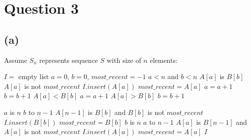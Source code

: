 
\section{Question 3}
    \subsection{(a)} 
    Assume $S_n$ represents sequence $S$ with size of $n$ elements:
    \begin{codebox}
        \li $I =$ empty list
        \li $a = 0$, $b = 0$, $most\_recent = -1$
        \li \While $a < n$ and $b<n$
            \Do
                \li \If $A[a]$ is $B[b]$
                \Then
                    \li \If $A[a]$ is not $most\_recent$
                    \Then
                        \li $I.insert(A[a])$
                        \li $most\_recent = A[a]$
                    \End
                    \li $a = a + 1$
                    \li $b = b + 1$
                \li \ElseIf $A[a] < B[b]$
                \Then
                    \li $a = a + 1$
                \li \ElseIf $A[a] > B[b]$
                \Then
                    \li $b = b + 1$
                \End 
            \End
    \end{codebox}
    \clearpage
    \newcommand\continuecodebox{\global\codeboxcontinuedtrue}   
    \begin{codebox}
        \li \If $a$ is $n$
        \Then
            \li \For $b$ to $n-1$
            \Then
                \li \If $A[n-1]$ is $B[b]$ and $B[b]$ is not $most\_recent$
                \Then
                    \li $I.insert(B[b])$
                    \li $most\_recent = B[b]$
                \End
            \End
        \li \ElseIf $b$ is $n$
        \Then
            \li \For $a$ to $n-1$
            \Then
                \li \If $A[a]$ is $B[n-1]$ and $A[a]$ is not $most\_recent$
                \Then
                    \li $I.insert(A[a])$
                    \li $most\_recent = A[a]$
                \End
            \End
        \End
        \li \Return $I$
    \end{codebox}
    
